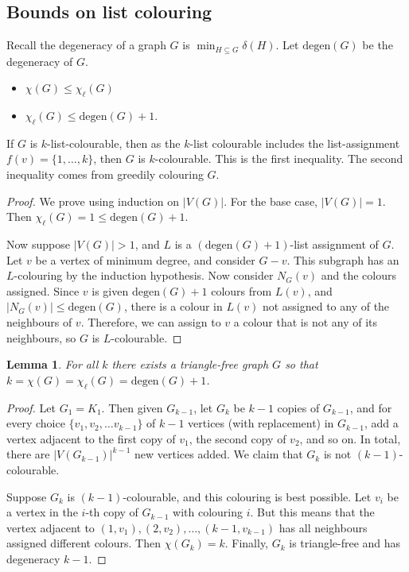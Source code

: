 \documentclass[]{article}
\newcommand{\degen}{\text{degen}}
\newtheorem{lemma}[theorem]{Lemma}
\theoremstyle{definition}
\numberwithin{theorem}{section}
\numberwithin{equation}{section}
\begin{document}
\subsection{Bounds on list colouring}
Recall the degeneracy of a graph $G$ is $\min_{H \subseteq G}\delta(H)$. 
Let $\degen(G)$ be the degeneracy of $G$. 
\begin{itemize}
	\item $\chi(G)\leq \chi_\ell(G)$
	\item $\chi_\ell(G)\leq \degen(G) + 1$.
\end{itemize}
If $G$ is $k$-list-colourable, then as the $k$-list colourable includes the list-assignment $f(v) = \{1, \ldots, k\}$, then $G$ is $k$-colourable. This is the first inequality. The second inequality comes from greedily colouring $G$.
\begin{proof}
	We prove using induction on $|V(G)|$. For the base case, $|V(G)| = 1$. Then $\chi_\ell(G) = 1 \leq \degen(G) + 1$.

	Now suppose $|V(G)|> 1$, and $L$ is a $(\degen(G) + 1)$-list assignment of $G$. Let $v$ be a vertex of minimum degree, and consider $G - v$. This subgraph has an $L$-colouring by the induction hypothesis. Now consider $N_G(v)$ and the colours assigned. Since $v$ is given $\degen(G) + 1$ colours from $L(v)$, and $|N_G(v)| \leq \degen(G)$, there is a colour in $L(v)$ not assigned to any of the neighbours of $v$. Therefore, we can assign to $v$ a colour that is not any of its neighbours, so $G$ is $L$-colourable.
\end{proof}

\begin{lemma}
	For all $k$ there exists a triangle-free graph $G$ so that $k = \chi(G) = \chi_\ell(G) = \degen(G) + 1$. 
\end{lemma}
\begin{proof}
	Let $G_1 = K_1$. Then given $G_{k-1}$, let $G_k$ be $k-1$ copies of $G_{k-1}$, and for every choice $\{v_1, v_2, \ldots v_{k-1}\}$ of $k-1$ vertices (with replacement) in $G_{k-1}$, add a vertex adjacent to the first copy of $v_1$, the second copy of $v_2$, and so on. In total, there are $|V(G_{k-1})|^{k-1}$ new vertices added. We claim that $G_k$ is not $(k - 1)$-colourable. 

	Suppose $G_k$ is $(k-1)$-colourable, and this colouring is best possible. Let $v_i$ be a vertex in the $i$-th copy of $G_{k-1}$ with colouring $i$. But this means that the vertex adjacent to $(1, v_1), (2, v_2), \ldots, (k-1, v_{k-1})$ has all neighbours assigned different colours. Then $\chi(G_k) = k$. Finally, $G_k$ is triangle-free and has degeneracy $k-1$. 
\end{proof}
\end{document}
